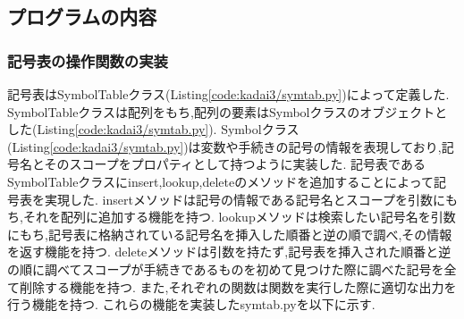 \documentclass[main]{subfiles}
\begin{document}
\subsection{プログラムの内容}
\subsubsection{記号表の操作関数の実装}
記号表はSymbolTableクラス(Listing\ref{code:kadai3/symtab.py})によって定義した.
SymbolTableクラスは配列をもち,配列の要素はSymbolクラスのオブジェクトとした(Listing\ref{code:kadai3/symtab.py}).
Symbolクラス(Listing\ref{code:kadai3/symtab.py})は変数や手続きの記号の情報を表現しており,記号名とそのスコープをプロパティとして持つように実装した.
記号表であるSymbolTableクラスにinsert,lookup,deleteのメソッドを追加することによって記号表を実現した.
insertメソッドは記号の情報である記号名とスコープを引数にもち,それを配列に追加する機能を持つ.
lookupメソッドは検索したい記号名を引数にもち,記号表に格納されている記号名を挿入した順番と逆の順で調べ,その情報を返す機能を持つ.
deleteメソッドは引数を持たず,記号表を挿入された順番と逆の順に調べてスコープが手続きであるものを初めて見つけた際に調べた記号を全て削除する機能を持つ.
また,それぞれの関数は関数を実行した際に適切な出力を行う機能を持つ.
これらの機能を実装したsymtab.pyを以下に示す.

\end{document}
